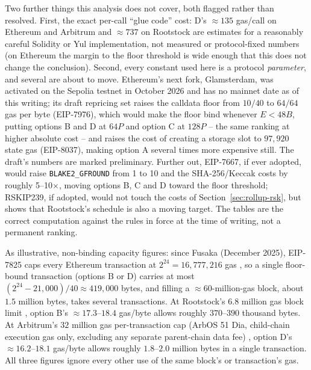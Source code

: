 Two further things this analysis does not cover, both flagged rather than
resolved. First, the exact per-call ``glue code'' cost: D's $\approx 135$
gas/call on Ethereum and Arbitrum and $\approx 737$ on Rootstock are
estimates for a reasonably careful Solidity or Yul implementation, not
measured or protocol-fixed numbers (on Ethereum the margin to the floor
threshold is wide enough that this does not change the conclusion).
Second, every constant used here is a protocol \emph{parameter}, and
several are about to move. Ethereum's next fork, Glamsterdam, was
activated on the Sepolia testnet in October 2026 and has no mainnet date
as of this writing; its draft repricing set \citep{eip8007} raises the
calldata floor from $10/40$ to $64/64$ gas per byte (EIP-7976), which
would make the floor bind whenever $E < 48B$, putting options B and D at
$64P$ and option C at $128P$ -- the same ranking at higher absolute cost --
and raises the cost of creating a storage slot to $97{,}920$ state gas
(EIP-8037), making option A several times more expensive still. The
draft's numbers are marked preliminary. Further out, EIP-7667, if ever
adopted, would raise \texttt{BLAKE2\_GFROUND} from 1 to 10 and the
SHA-256/Keccak costs by roughly 5--10$\times$, moving options B, C and D
toward the floor threshold; RSKIP239, if adopted, would not touch the
costs of Section~\ref{sec:rollup-rsk}, but shows that Rootstock's schedule
is also a moving target. The tables are the correct computation against
the rules in force at the time of writing, not a permanent ranking.

As illustrative, non-binding capacity figures: since Fusaka (December
2025), EIP-7825 caps every Ethereum transaction at $2^{24} =
16{,}777{,}216$ gas \citep{eip7825}, so a single floor-bound transaction
(options B or D) carries at most $(2^{24} - 21{,}000)/40 \approx 419{,}000$
bytes, and filling a $\approx\!60$-million-gas block, about $1.5$ million
bytes, takes several transactions. At Rootstock's $6.8$ million gas block
limit \citep{rskgas}, option B's $\approx\!17.3$--$18.4$ gas/byte allows
roughly $370$--$390$ thousand bytes. At Arbitrum's $32$ million gas
per-transaction cap (ArbOS 51 Dia, child-chain execution gas only,
excluding any separate parent-chain data fee) \citep{arbos51}, option D's
$\approx\!16.2$--$18.1$ gas/byte allows roughly $1.8$--$2.0$ million bytes
in a single transaction. All three figures ignore every other use of the
same block's or transaction's gas.
